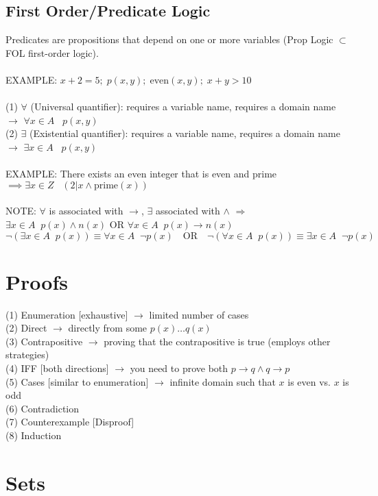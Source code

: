 \subsection{First Order/Predicate Logic}
Predicates are propositions that depend on one or more variables (Prop Logic $\subset$ FOL first-order logic). \\
\\
EXAMPLE: $x+2 = 5;\;p(x,y);\;\text{even}(x,y);\;x+y > 10$ \\
\\
(1) $\forall$ (Universal quantifier): requires a variable name, requires a domain name $\rightarrow$ $\forall x \in A\;\;\;p(x,y)$\\
(2) $\exists$ (Existential quantifier): requires a variable name, requires a domain name $\rightarrow$ $\exists x \in A\;\;\;p(x,y)$\\
\\
EXAMPLE: There exists an even integer that is even and prime $\implies \exists x \in Z\;\;\;(2|x \wedge \text{prime}(x))$ \\
\\
NOTE: $\forall$ is associated with $\rightarrow$, $\exists$ associated with $\wedge$ $\Longrightarrow$ $\exists x \in A\;\;p(x) \wedge n(x)$ OR $\forall x \in A\;\;p(x) \rightarrow n(x)$ \\
$$
\neg(\exists x \in A\;\;p(x)) \equiv \forall x \in A\;\;\neg p(x) \quad \text{OR} \quad \neg(\forall x \in A\;\;p(x)) \equiv \exists x \in A\;\;\neg p(x)
$$
\pagebreak
\section{Proofs}
(1) Enumeration [exhaustive] $\rightarrow$ limited number of cases\\
(2) Direct $\rightarrow$ directly from some $p(x) \dots q(x)$\\
(3) Contrapositive $\rightarrow$ proving that the contrapositive is true (employs other strategies)\\
(4) IFF [both directions] $\rightarrow$ you need to prove both $p \rightarrow q \wedge q \rightarrow p$ \\ 
(5) Cases [similar to enumeration] $\rightarrow$ infinite domain such that $x$ is even vs. $x$ is odd\\ 
(6) Contradiction \\
(7) Counterexample [Disproof]\\
(8) Induction
\section{Sets}
